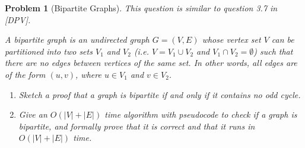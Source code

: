 \documentclass[10pt]{article}
\newtheorem{problem}{\sc\color{cit}Problem}
\begin{document}
\begin{problem}[Bipartite Graphs]
This question is similar to question 3.7 in [DPV].

A bipartite graph is an undirected graph $G=(V,E)$ whose vertex set $V$ can be partitioned into two sets $V_1$ and $V_2$ (i.e. $V = V_1 \cup V_2$ and $V_1 \cap V_2 = \emptyset$) such that there are no edges between vertices of the same set. In other words, all edges are of the form $(u,v)$, where $u \in V_1$ and $v \in V_2$.

\begin{enumerate}
    \item[(a)]Sketch a proof that a graph is bipartite if and only if it contains no odd cycle.
    \item[(b)]Give an $O(|V|+|E|)$ time algorithm with pseudocode to check if a graph is bipartite, and formally prove that it is correct and that it runs in $O(|V|+|E|)$ time. 
\end{enumerate}
\end{problem}
\end{document}
